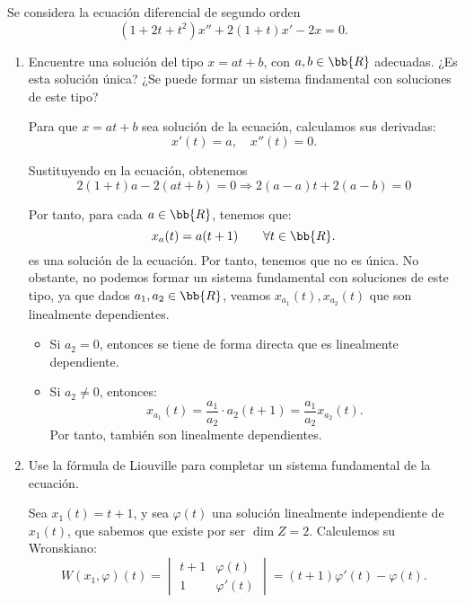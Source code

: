 \documentclass[12pt]{article}
\begin{document}
    \begin{ejercicio}
    Se considera la ecuación diferencial de segundo orden
    \begin{equation*}
        (1+2t+t^2)x''+2(1+t)x'-2x=0.
    \end{equation*}
    \begin{enumerate}
        \item Encuentre una solución del tipo $x=at+b$, con $a,b\in\bb{R}$ adecuadas. ¿Es esta solución única? ¿Se puede formar un sistema findamental con soluciones de este tipo?
        
        Para que $x=at+b$ sea solución de la ecuación, calculamos sus derivadas:
        \begin{equation*}
            x'(t)=a,\quad x''(t)=0.
        \end{equation*}

        Sustituyendo en la ecuación, obtenemos
        \begin{equation*}
            2(1+t)a-2(at+b)=0
            \Longrightarrow 2(a-a)t+2(a-b)=0
        \end{equation*}

        Por tanto, para cada $a\in \bb{R}$, tenemos que:
        \begin{equation*}
            x_a(t)=a(t+1)\qquad \forall t\in\bb{R}.
        \end{equation*}
        es una solución de la ecuación. Por tanto, tenemos que no es única. No obstante, no podemos formar un sistema fundamental con soluciones de este tipo, ya que dados $a_1,a_2\in\bb{R}$, veamos $x_{a_1}(t),x_{a_2}(t)$ que son linealmente dependientes.
        \begin{itemize}
            \item Si $a_2=0$, entonces se tiene de forma directa que es linealmente dependiente.
            \item Si $a_2\neq 0$, entonces:
            \begin{equation*}
                x_{a_1}(t)=\dfrac{a_1}{a_2}\cdot a_2 (t+1)=\dfrac{a_1}{a_2}x_{a_2}(t).
            \end{equation*}
            Por tanto, también son linealmente dependientes.
        \end{itemize}

        \item Use la fórmula de Liouville para completar un sistema fundamental de la ecuación.
        
        Sea $x_1(t)=t+1$, y sea $\varphi(t)$ una solución linealmente independiente de $x_1(t)$, que sabemos que existe por ser $\dim Z=2$. Calculemos su Wronskiano:
        \begin{equation*}
            W(x_1,\varphi)(t)=\begin{vmatrix}
                t+1 & \varphi(t)\\
                1 & \varphi'(t)
            \end{vmatrix}=(t+1)\varphi'(t)-\varphi(t).
        \end{equation*}
        

\end{enumerate}
\end{ejercicio}
\end{document}
